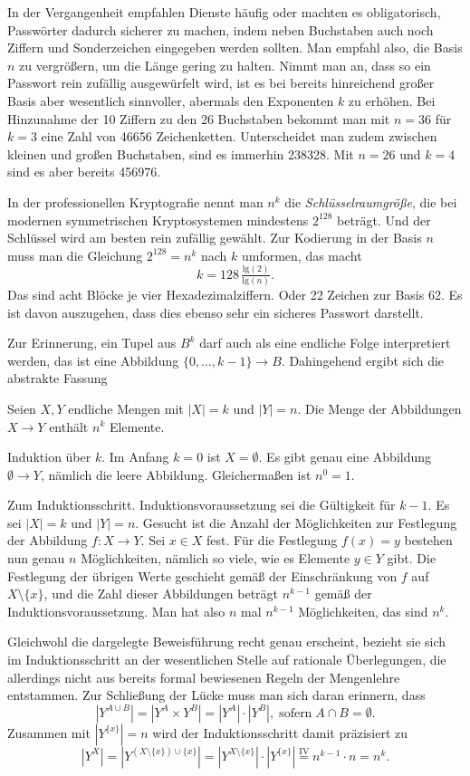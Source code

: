 In der Vergangenheit empfahlen Dienste häufig oder machten es obligatorisch,
Passwörter dadurch sicherer zu machen, indem neben Buchstaben auch noch
Ziffern und Sonderzeichen eingegeben werden sollten. Man
empfahl also, die Basis $n$ zu vergrößern, um die Länge gering zu halten.
Nimmt man an, dass so ein Passwort rein zufällig ausgewürfelt wird, ist
es bei bereits hinreichend großer Basis aber wesentlich sinnvoller,
abermals den Exponenten $k$ zu erhöhen. Bei Hinzunahme der 10 Ziffern zu
den 26 Buchstaben bekommt man mit $n=36$ für $k=3$ eine Zahl von 46656
Zeichenketten. Unterscheidet man zudem zwischen kleinen und großen
Buchstaben, sind es immerhin 238328. Mit $n=26$ und $k=4$ sind es aber
bereits 456976.

In der professionellen Kryptografie nennt man $n^k$ die
\emph{Schlüsselraumgröße}, die bei modernen symmetrischen Kryptosystemen
mindestens $2^{128}$ beträgt. Und der Schlüssel wird am besten rein
zufällig gewählt. Zur Kodierung in der Basis $n$ muss man die Gleichung
$2^{128} = n^k$ nach $k$ umformen, das macht
\[k = 128\,\tfrac{\mathrm{lg}(2)}{\mathrm{lg}(n)}.\]
Das sind acht Blöcke je vier Hexadezimalziffern. Oder 22 Zeichen
zur Basis 62. Es ist davon auszugehen, dass dies ebenso sehr ein sicheres
Passwort darstellt.

Zur Erinnerung, ein Tupel aus $B^k$ darf auch als eine endliche Folge
interpretiert werden, das ist eine Abbildung
$\{0,\ldots,k-1\}\to B.$
Dahingehend ergibt sich die abstrakte Fassung

\begin{Satz}\label{Anzahl-Abb}\newlinefirst
Seien $X,Y$ endliche Mengen mit $|X| = k$ und $|Y|=n$. Die Menge
der Abbildungen $X\to Y$ enthält $n^k$ Elemente.
\end{Satz}
\begin{Beweis}
Induktion über $k$. Im Anfang $k=0$ ist $X=\emptyset$. Es gibt genau
eine Abbildung $\emptyset\to Y$, nämlich die leere Abbildung.
Gleichermaßen ist $n^0=1$.

Zum Induktionsschritt. Induktionsvoraussetzung sei die Gültigkeit
für $k-1$. Es  sei $|X|=k$ und $|Y|=n$. Gesucht ist die Anzahl
der Möglichkeiten zur Festlegung der Abbildung $f\colon X\to Y$.
Sei $x\in X$ fest. Für die Festlegung $f(x)=y$ bestehen nun genau $n$
Möglichkeiten, nämlich so viele, wie es Elemente $y\in Y$ gibt.
Die Festlegung der übrigen Werte geschieht gemäß der Einschränkung
von $f$ auf $X\setminus\{x\}$, und die Zahl dieser Abbildungen beträgt
$n^{k-1}$ gemäß der Induktionsvoraussetzung. Man hat also $n$ mal
$n^{k-1}$ Möglichkeiten, das sind $n^k$.\,\qedsymbol
\end{Beweis}
Gleichwohl die dargelegte Beweisführung recht genau erscheint,
bezieht sie sich im Induktionsschritt an der wesentlichen Stelle
auf rationale Überlegungen, die allerdings nicht aus bereits
formal bewiesenen Regeln der Mengenlehre entstammen. Zur Schließung der
Lücke muss man sich daran erinnern, dass
\[|Y^{A\cup B}| = |Y^A\times Y^B| = |Y^A|\cdot |Y^B|,\;
\text{sofern}\; A\cap B=\emptyset.\]
Zusammen mit $|Y^{\{x\}}|=n$ wird der Induktionsschritt damit präzisiert zu
\[|Y^X| = |Y^{(X\setminus\{x\})\cup\{x\}}| = |Y^{X\setminus\{x\}}|\cdot |Y^{\{x\}}|
\stackrel{\mathrm{IV}}= n^{k-1}\cdot n = n^k.\]

